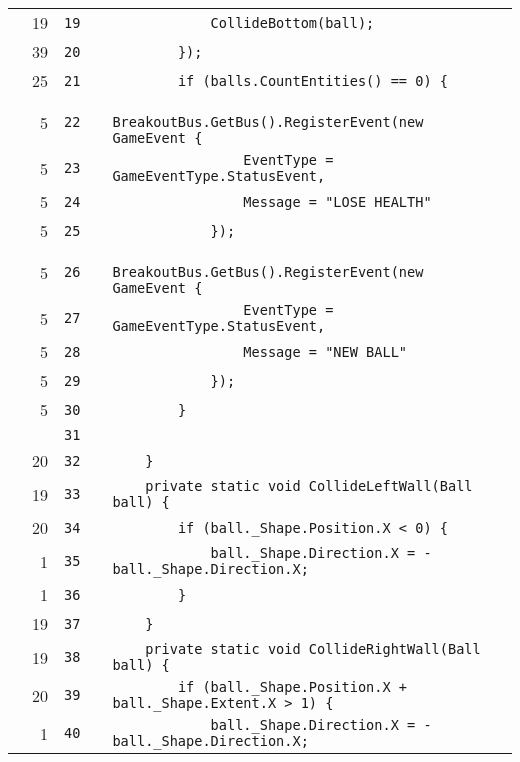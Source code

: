 \documentclass[a4paper,landscape,10pt]{article}
\begin{document}
\begin{longtable}[l]{lrrll}
\cellcolor{green} & 19 & \verb~19~ & & \verb~            CollideBottom(ball);~\\
\cellcolor{green} & 39 & \verb~20~ & & \verb~        });~\\
\cellcolor{green} & 25 & \verb~21~ & & \verb~        if (balls.CountEntities() == 0) {~\\
\cellcolor{green} & 5 & \verb~22~ & & \verb~            BreakoutBus.GetBus().RegisterEvent(new GameEvent {~\\
\cellcolor{green} & 5 & \verb~23~ & & \verb~                EventType = GameEventType.StatusEvent,~\\
\cellcolor{green} & 5 & \verb~24~ & & \verb~                Message = "LOSE HEALTH"~\\
\cellcolor{green} & 5 & \verb~25~ & & \verb~            });~\\
\cellcolor{green} & 5 & \verb~26~ & & \verb~            BreakoutBus.GetBus().RegisterEvent(new GameEvent {~\\
\cellcolor{green} & 5 & \verb~27~ & & \verb~                EventType = GameEventType.StatusEvent,~\\
\cellcolor{green} & 5 & \verb~28~ & & \verb~                Message = "NEW BALL"~\\
\cellcolor{green} & 5 & \verb~29~ & & \verb~            });~\\
\cellcolor{green} & 5 & \verb~30~ & & \verb~        }~\\
\cellcolor{gray} &  & \verb~31~ & & \verb~~\\
\cellcolor{green} & 20 & \verb~32~ & & \verb~    }~\\
\cellcolor{green} & 19 & \verb~33~ & & \verb~    private static void CollideLeftWall(Ball ball) {~\\
\cellcolor{green} & 20 & \verb~34~ & & \verb~        if (ball._Shape.Position.X < 0) {~\\
\cellcolor{green} & 1 & \verb~35~ & & \verb~            ball._Shape.Direction.X = -ball._Shape.Direction.X;~\\
\cellcolor{green} & 1 & \verb~36~ & & \verb~        }~\\
\cellcolor{green} & 19 & \verb~37~ & & \verb~    }~\\
\cellcolor{green} & 19 & \verb~38~ & & \verb~    private static void CollideRightWall(Ball ball) {~\\
\cellcolor{green} & 20 & \verb~39~ & & \verb~        if (ball._Shape.Position.X + ball._Shape.Extent.X > 1) {~\\
\cellcolor{green} & 1 & \verb~40~ & & \verb~            ball._Shape.Direction.X = -ball._Shape.Direction.X;~\\

\end{longtable}
\end{document}
